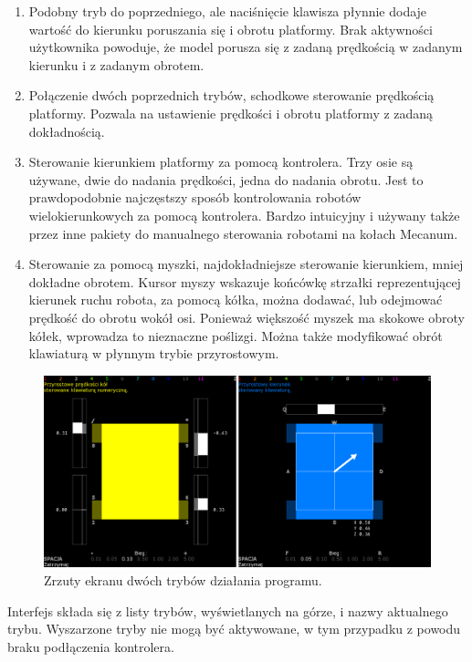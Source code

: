 \begin{enumerate}
			\item Podobny tryb do poprzedniego, ale naciśnięcie klawisza płynnie dodaje wartość do kierunku poruszania się i obrotu platformy.
			Brak aktywności użytkownika powoduje, że model porusza się z zadaną prędkością w zadanym kierunku i z zadanym obrotem.
			\item Połączenie dwóch poprzednich trybów, schodkowe sterowanie prędkością platformy. Pozwala na ustawienie prędkości i obrotu platformy z zadaną dokładnością.
			\item Sterowanie kierunkiem platformy za pomocą kontrolera. Trzy osie są używane, dwie do nadania prędkości, jedna do nadania obrotu.
			Jest to prawdopodobnie najczęstszy sposób kontrolowania robotów wielokierunkowych za pomocą kontrolera.
			Bardzo intuicyjny i używany także przez inne pakiety do manualnego sterowania robotami na kołach Mecanum.
			\item Sterowanie za pomocą myszki, najdokładniejsze sterowanie kierunkiem, mniej dokładne obrotem.
			Kursor myszy wskazuje końcówkę strzałki reprezentującej kierunek ruchu robota, za pomocą kółka, można dodawać, lub odejmować prędkość do obrotu wokół osi.
			Ponieważ większość myszek ma skokowe obroty kółek, wprowadza to nieznaczne poślizgi. Można także modyfikować obrót klawiaturą w płynnym trybie przyrostowym.
		\end{enumerate}
		
		\begin{figure}[H]
		\centering
		\includegraphics[width=\textwidth]{graphics/lalkarz.png}
		\caption{Zrzuty ekranu dwóch trybów działania programu.}
		\label{fig:lalkarz}
		\end{figure}
		
		Interfejs składa się z listy trybów, wyświetlanych na górze, i nazwy aktualnego trybu.
		Wyszarzone tryby nie mogą być aktywowane, w tym przypadku z powodu braku podłączenia kontrolera.
		
